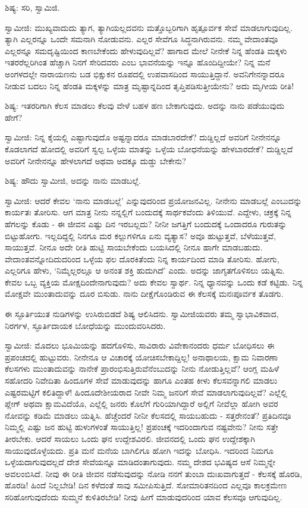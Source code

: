 ಶಿಷ್ಯ: ಸರಿ, ಸ್ವಾಮಿಜಿ.

ಸ್ವಾಮೀಜಿ: ಮುಖ್ಯವಾದುದು ತ್ಯಾಗ, ತ್ಯಾಗಿಯಲ್ಲದವನು ಮತ್ತೊಬ್ಬರಿಗಾಗಿ ಹೃತ್ಪೂರ್ವಕ ಸೇವೆ ಮಾಡಲಾಗುವುದಿಲ್ಲ. ತ್ಯಾಗಿ ಎಲ್ಲರನ್ನೂ ಒಂದೇ ಸಮನಾಗಿ ನೋಡುವನು. ಎಲ್ಲರ ಸೇವೆಗೂ ಸಿದ್ಧನಾಗಿರುವನು. ನಮ್ಮ ವೇದಾಂತವೂ ಎಲ್ಲರನ್ನೂ ಸಮದೃಷ್ಟಿಯಿಂದ ಕಾಣಬೇಕೆಂದು ಹೇಳುವುದಿಲ್ಲವೆ? ಹಾಗಾದ ಮೇಲೆ ನೀನೇಕೆ ನಿನ್ನ ಹೆಂಡತಿ ಮಕ್ಕಳು ಇತರರೆಲ್ಲರಿಗಿಂತ ಹೆಚ್ಚಾಗಿ ನಿನಗೆ ಸೇರಿದವರು ಎಂಬ ಭಾವನೆಯನ್ನು ಇನ್ನೂ ಹೊಂದಿದ್ದೀಯೇ? ನಿನ್ನ ಮನೆ ಅಂಗಳದಲ್ಲೇ ನಾರಾಯಣನು ಬಡ ಭಿಕ್ಷುಕನ ರೂಪದಲ್ಲಿ ಉಪವಾಸದಿಂದ ಸಾಯುತ್ತಿದ್ದಾನೆ. ಅವನಿಗೇನನ್ನಾದರೂ ನೀಡುವ ಬದಲು ನಿನ್ನ ಹೆಂಡತಿ ಮಕ್ಕಳನ್ನು ಮಾತ್ರ ಮೃಷ್ಟಾನ್ನದಿಂದ ತೃಪ್ತಿಪಡಿಸುತ್ತೀಯೇನು? ಅದು ಮೃಗೀಯ ರೀತಿ!

ಶಿಷ್ಯ: ಇತರರಿಗಾಗಿ ಕೆಲಸ ಮಾಡಲು ಕೆಲವು ವೇಳೆ ಬಹಳ ಹಣ ಬೇಕಾಗುವುದು. ಅದನ್ನು ನಾನು ಪಡೆಯುವುದು ಹೇಗೆ?

ಸ್ವಾಮೀಜಿ: ನಿನ್ನ ಕೈಯಲ್ಲಿ ಎಷ್ಟಾಗುವುದೊ ಅಷ್ಟನ್ನಾದರೂ ಮಾಡಬಾರದೇಕೆ? ದುಡ್ಡಿಲ್ಲದೆ ಅವರಿಗೆ ನೀನೇನನ್ನೂ ಕೊಡಲಾಗದೆ ಹೋದಲ್ಲಿ ಅವರಿಗೆ ಸ್ವಲ್ಪ ಒಳ್ಳೆಯ ಮಾತನ್ನು ಒಳ್ಳೆಯ ಬೋಧನೆಯನ್ನು ಹೇಳಬಾರದೇಕೆ? ದುಡ್ಡಿಲ್ಲದೆ ಅವರಿಗೆ ನೀನೇನನ್ನೂ ಹೇಳಲಾಗದೆ ಅಥವಾ ಅದಕ್ಕೂ ದುಡ್ಡು ಬೇಕೇನು?

ಶಿಷ್ಯ: ಹೌದು ಸ್ವಾಮೀಜಿ, ಅದನ್ನು ನಾನು ಮಾಡಬಲ್ಲೆ.

ಸ್ವಾಮೀಜಿ: ಆದರೆ ಕೇವಲ ‘ನಾನು ಮಾಡಬಲ್ಲೆ’ ಎನ್ನುವುದರಿಂದ ಪ್ರಯೋಜನವಿಲ್ಲ. ನೀನೇನು ಮಾಡಬಲ್ಲೆ ಎಂಬುದನ್ನು ಕಾರ್ಯತಃ ತೋರಿಸು. ಆಗ ಮಾತ್ರ ನೀನು ನನ್ನಲ್ಲಿಗೆ ಬಂದುದಕ್ಕೆ ಸಾರ್ಥಕವೆಂದು ತಿಳಿಯುವೆ. ಎದ್ದೇಳು, ಚಕ್ರಕ್ಕೆ ನಿನ್ನ ಹೆಗಲನ್ನು ಕೊಡು - ಈ ಜೀವನ ಎಷ್ಟು ದಿನ ಇರಬಲ್ಲದು? ನೀನೀ ಜಗತ್ತಿಗೆ ಬಂದುದಕ್ಕೆ ಒಂದಾದರೂ ಗುರುತನ್ನು ಬಿಟ್ಟುಹೋಗು. ಇಲ್ಲದಿದ್ದಲ್ಲಿ ನಿನಗೂ ಮರ ಕಲ್ಲುಗಳಿಗೂ ಏನು ವ್ಯತ್ಯಾಸ? ಅವೂ ಹುಟ್ಟುತ್ತವೆ, ಬೆಳೆಯುತ್ತವೆ, ಸಾಯುತ್ತವೆ. ನೀನೂ ಅದೇ ರೀತಿ ಹುಟ್ಟಿ ಸಾಯಬೇಕೆಂದು ಬಯಸಿದಲ್ಲಿ ನೀನೂ ಹಾಗೇ ಮಾಡಬಹುದು. ವೇದಾಂತವನ್ನೋದಿದುದರಿಂದ ಒಳ್ಳೆಯ ಫಲ ದೊರಕಿತೆಂದು ನಿನ್ನ ಕಾರ್ಯದಿಂದ ಮಾಡಿ ತೋರಿಸು. ಹೋಗು, ಎಲ್ಲರಿಗೂ ಹೇಳು, ‘ನಿಮ್ಮೆಲ್ಲರಲ್ಲೂ ಆ ಅನಂತ ಶಕ್ತಿ ಹುದುಗಿದೆ’ ಎಂದು. ಅದನ್ನು ಜಾಗೃತಗೊಳಿಸಲು ಯತ್ನಿಸು. ಕೇವಲ ಒಬ್ಬ ವ್ಯಕ್ತಿಯ ಮೋಕ್ಷದಿಂದೇನಾಗುವುದು? ಅದು ಕೇವಲ ಸ್ವಾರ್ಥ. ನಿನ್ನ ಧ್ಯಾನವನ್ನು ಒಂದು ಕಡೆ ಕಟ್ಟಿಡು. ನಿನ್ನ ಮೋಕ್ಷವೇ ಮುಂತಾದುವನ್ನು ದೂರ ಬಿಸುಡು. ನಾನು ದೀಕ್ಷೆಗೊಂಡಿರುವ ಈ ಕೆಲಸಕ್ಕೆ ಮನಃಪೂರ್ವಕ ತೊಡಗು.

ಈ ಸ್ಫೂರ್ತಿಯುತ ನುಡಿಗಳನ್ನು ಉಸಿರುಬಿಡದೆ ಶಿಷ್ಯ ಆಲಿಸಿದನು. ಸ್ವಾಮೀಜಿಯವರು ತಮ್ಮ ಸ್ವಾಭಾವಿಕವಾದ, ನಿರರ್ಗಳ, ಸ್ಫೂರ್ತಿದಾಯಕ ಬೋಧೆಯನ್ನು ಮುಂದುವರಿಸಿದರು.

ಸ್ವಾಮೀಜಿ: ಮೊದಲು ಭೂಮಿಯನ್ನು ಹದಗೊಳಿಸು, ಸಾವಿರಾರು ವಿವೇಕಾನಂದರು ಧರ್ಮ ಬೋಧಿಸಲು ಈ ಪ್ರಪಂಚದಲ್ಲಿ ಹುಟ್ಟುವರು. ನೀನೇನೂ ಆ ವಿಚಾರಕ್ಕೆ ಯೋಚಿಸಬೇಕಾದ್ದಿಲ್ಲ! ಅನಾಥಾಲಯ, ಕ್ಷಾಮ ನಿವಾರಣಾ ಕೆಲಸಗಳು ಮುಂತಾದುವನ್ನು ನಾನೇಕೆ ಪ್ರಾರಂಭಿಸುತ್ತಿರುವೆನೆಂಬುದನ್ನು ನೀನು ನೋಡುತ್ತಿಲ್ಲವೆ? ಆಂಗ್ಲ ಮಹಿಳೆ ಸಹೋದರಿ ನಿವೇದಿತಾ ಹಿಂದೂಗಳ ಸೇವೆ ಮಾಡುವುದನ್ನು ಹಾಗೂ ಎಂತಹ ಕೀಳು ಕೆಲಸವನ್ನಾಗಲಿ ಮಾಡಲು ಎಷ್ಟರಮಟ್ಟಿಗೆ ಕಲಿತಿದ್ದಾಳೆ! ಹಿಂದೂದೇಶೀಯರಾದ ನೀವೇ ನಿಮ್ಮ ಜನರಿಗೆ ಸೇವೆ ಮಾಡಲಾಗುವುದಿಲ್ಲವೆ? ಎಲ್ಲೆಲ್ಲಿ ಪ್ಲೇಗ್ ಅಥವಾ ಕ್ಷಾಮವಿದೆಯೊ, ಎಲ್ಲೆಲ್ಲಿ ಜನರು ಕೊಲೆಗೆ ಗುರಿಯಾಗಿದ್ದಾರೆ ಅಲ್ಲಿಗೆ ನೀವೆಲ್ಲಾ ಹೋಗಿ ಅವರ ನೋವನ್ನು ಕಡಿಮೆ ಮಾಡಲು ಯತ್ನಿಸಿ. ಹೆಚ್ಚೆಂದರೆ ನೀನೀ ಕೆಲಸದಲ್ಲಿ ಸಾಯಬಹುದು - ಸತ್ತರೇನಂತೆ? ಪ್ರತಿದಿನವೂ ನಿಮ್ಮಲ್ಲಿ ಎಷ್ಟು ಜನ ಹುಟ್ಟಿ ಹುಳುಗಳಂತೆ ಸಾಯುತ್ತಿಲ್ಲ! ಪ್ರಪಂಚಕ್ಕೆ ಇದರಿಂದಾಗುವ ನಷ್ಟವೇನು? ನೀನು ಸತ್ತೇ ತೀರಬೇಕು. ಆದರೆ ಸಾಯಲು ಒಂದು ಘನ ಉದ್ದೇಶವಿರಲಿ. ಜೀವನದಲ್ಲಿ ಒಂದು ಘನ ಉದ್ದೇಶಕ್ಕಾಗಿ ಸಾಯುವುದೊಳ್ಳೆಯದು. ಪ್ರತಿ ಮನೆ ಮನೆಯ ಬಾಗಿಲಿಗೂ ಹೋಗಿ ಇದನ್ನು ಬೋಧಿಸಿ. ಇದರಿಂದ ನಿಮಗೂ ಒಳ್ಳೆಯದಾಗುವುದಲ್ಲದೆ ದೇಶ ಸೇವೆಯನ್ನೂ ಮಾಡಿದಂತಾಗುವುದು. ನಮ್ಮ ದೇಶದ ಭವಿಷ್ಯದ ಆಸೆ ನಿಮ್ಮನ್ನೇ ಅವಲಂಬಿಸಿದೆ. ನೀವು ಈ ರೀತಿ ಜೀವನ ನಡೆಸುವುದನ್ನು ನೋಡಿ ನನಗೆ ತುಂಬಾ ದುಃಖವಾಗುತ್ತದೆ - ಕೆಲಸಕ್ಕೆ ಹೊರಡಿ, ಹೊರಡಿ! ಹಿಂದೆ ನಿಲ್ಲಬೇಡಿ! ದಿನ ಕಳೆದಂತೆ ಸಾವು ಸಮೀಪಿಸುತ್ತಿದೆ. ಸೋಮಾರಿತನದಿಂದ ಎಲ್ಲವೂ ಕಾಲಕ್ರಮೇಣ ಸರಿಹೋಗುವುದೆಂದು ಸುಮ್ಮನೆ ಕುಳಿತಿರಬೇಡಿ! ನೀವು ಹೀಗೆ ಮಾಡುವುದರಿಂದ ಯಾವ ಕೆಲಸವೂ ಆಗುವುದಿಲ್ಲ.

